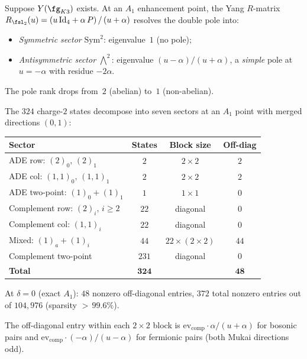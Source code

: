 \begin{conjecture}
\label{conj:nonabelian-pole-resolution}
\ClaimStatusConjectured
Suppose $Y(\fg_{K3})$ exists. At an $A_1$ enhancement point,
the Yang $R$-matrix $R_{\fsl_2}(u) = (u\,\mathrm{Id}_4 + \alpha\, P)\,/\,(u + \alpha)$
resolves the double pole into:
\begin{itemize}
 \item \emph{Symmetric sector} $\mathrm{Sym}^2$:
 eigenvalue~$1$ \textup{(}no pole\textup{)};
 \item \emph{Antisymmetric sector} $\textstyle\bigwedge^2$:
 eigenvalue $(u - \alpha)/(u + \alpha)$,
 a \emph{simple} pole at $u = -\alpha$ with residue $-2\alpha$.
\end{itemize}
The pole rank drops from~$2$ \textup{(}abelian\textup{)} to~$1$
\textup{(}non-abelian\textup{)}.
\end{conjecture}

\begin{computation}
\label{comp:offdiag-rmatrix-a1}
The $324$ charge-$2$ states decompose into seven sectors at an
$A_1$ point with merged directions $(0,1)$:
\begin{center}
\renewcommand{\arraystretch}{1.2}
\begin{tabular}{lccc}
\toprule
\textbf{Sector} & \textbf{States} & \textbf{Block size} & \textbf{Off-diag} \\
\midrule
ADE row: $(2)_0,\, (2)_1$ & $2$ & $2\times 2$ & $2$ \\
ADE col: $(1{,}1)_0,\, (1{,}1)_1$ & $2$ & $2\times 2$ & $2$ \\
ADE two-point: $(1)_0 + (1)_1$ & $1$ & $1\times 1$ & $0$ \\
Complement row: $(2)_i,\, i \geq 2$ & $22$ & diagonal & $0$ \\
Complement col: $(1{,}1)_i$ & $22$ & diagonal & $0$ \\
Mixed: $(1)_a + (1)_i$ & $44$ & $22\times(2\times 2)$ & $44$ \\
Complement two-point & $231$ & diagonal & $0$ \\
\midrule
\textbf{Total} & $\mathbf{324}$ & & $\mathbf{48}$ \\
\bottomrule
\end{tabular}
\end{center}
At $\delta = 0$ \textup{(}exact $A_1$\textup{)}: $48$ nonzero
off-diagonal entries, $372$ total nonzero entries out of $104{,}976$
\textup{(}sparsity ${>}\,99.6\%$\textup{)}.

The off-diagonal entry within each $2 \times 2$ block is
$\mathrm{ev}_{\mathrm{comp}} \cdot \alpha / (u + \alpha)$
for bosonic pairs and
$\mathrm{ev}_{\mathrm{comp}} \cdot (-\alpha) / (u - \alpha)$
for fermionic pairs \textup{(}both Mukai directions odd\textup{)}.
\end{computation}

